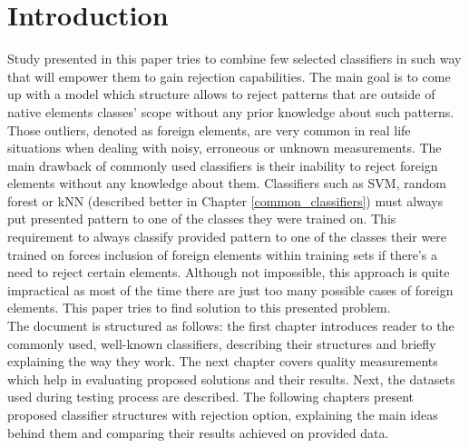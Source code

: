 \chapter{Introduction}

Study presented in this paper tries to combine few selected classifiers in such way that will empower them to gain rejection capabilities. The main goal is to come up with a model which structure allows to reject patterns that are outside of native elements classes' scope without any prior knowledge about such patterns. Those outliers, denoted as foreign elements, are very common in real life situations when dealing with noisy, erroneous or unknown measurements. The main drawback of commonly used classifiers is their inability to reject foreign elements without any knowledge about them. Classifiers such as SVM, random forest or kNN (described better in Chapter \ref{common_classifiers}) must always put presented pattern to one of the classes they were trained on. This  requirement to always classify provided pattern to one of the classes their were trained on forces inclusion of foreign elements within training sets if there's a need to reject certain elements. Although not impossible, this approach is quite impractical as most of the time there are just too many possible cases of foreign elements. This paper tries to find solution to this presented problem. \\

The document is structured as follows: the first chapter introduces reader to the commonly used, well-known classifiers, describing their structures and briefly explaining the way they work. The next chapter covers quality measurements which help in evaluating proposed solutions and their results. Next, the datasets used during testing process are described. The following chapters present proposed classifier structures with rejection option, explaining the main ideas behind them and comparing their results achieved on provided data. 

